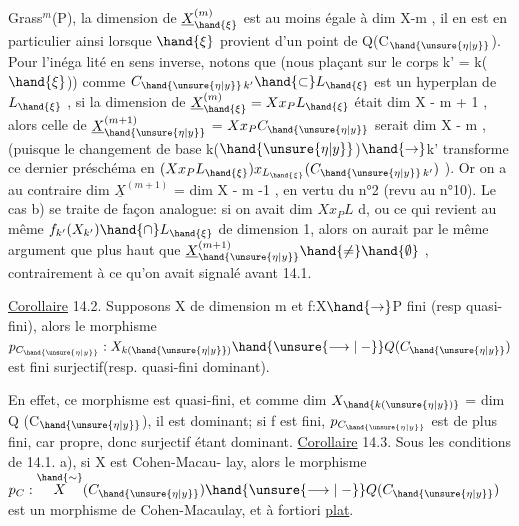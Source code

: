 
Grass$^{m}$(P), la dimension de $\underline{X}^{(m)}_{\hand{\xi}}$ est au moins égale à dim X-m , il en est
en particulier ainsi lorsque $\hand{\xi}$ provient d'un point de Q(C$_{\hand{\unsure{\eta|y}}}$). Pour l'inéga
lité en sens inverse, notons que (nous plaçant sur le corps k' = k($\hand{\xi}$))
comme $C_{\hand{\unsure{\eta|y}}\,k'} \hand{\subset} L_{\hand{\xi}}$ est  un hyperplan de $L_{\hand{\xi}}$ , si la dimension de
$\underline{X}^{(m)}_{\hand{\xi}} = Xx_{P}L_{\hand{\xi}}$ était \hand{$\geqslant$} dim X - m + 1 , alors celle de $\underline{X}^{(m+1)}_{\hand{\unsure{\eta|y}}}$ =
$Xx_{P}C_{\hand{\unsure{\eta|y}}}$ serait \hand{$\geqslant$} dim X - m , (puisque le changement de base k($\hand{\unsure{\eta|y}}$)$\hand{\to}$k'
transforme ce dernier préschéma en $(Xx_{P}L_{\hand{\xi}})x_{L_{\hand{\xi}}}(C_{\hand{\unsure{\eta|y}}\,k'})$ ). Or on a au
contraire  dim $\underline{X}^{(m+1)}$ = dim X - m -1 
, en vertu du n°2 (revu au n°10).
Le cas b)  se traite
de façon analogue: si on avait dim $Xx_{P}L$ \hand{$\geqslant$} d,  ou
ce qui revient au même  $f_{k'}(X_{k'}) \hand{\cap} L_{\hand{\xi}}$ de dimension \hand{$\geqslant$}1,
alors on aurait par le même argument que plus  haut que
$\underline{X}^{(m+1)}_{\hand{\unsure{\eta|y}}} \hand{\neq} \hand{\emptyset}$ , contrairement à ce qu'on avait signalé avant 14.1.

\uline{Corollaire} 14.2. Supposons X de dimension m et f:X$\hand{\to}$P fini (resp quasi-fini), alors
le morphisme $p_{C_{\hand{\unsure{\eta|y}}}} : X_{k(\hand{\unsure{\eta|y}})} \hand{\unsure{\longrightarrow|\relbar}} Q(C_{\hand{\unsure{\eta|y}}})$ est fini surjectif(resp. quasi-fini
dominant).

En effet, ce morphisme est quasi-fini, et comme dim $X_{\hand{k(\unsure{\eta|y})}}$ = dim Q (C$_{\hand{\unsure{\eta|y}}}$), il est
dominant;  si f est fini, $p_{C_{\hand{\unsure{\eta|y}}}}$ est de plus fini,
 car propre, donc surjectif étant dominant.
\uline{Corollaire} 14.3. Sous les conditions de 14.1. a), si X est Cohen-Macau-%
lay, alors le morphisme $p_{C} : \overset{\hand{\sim}}{X}(C_{\hand{\unsure{\eta|y}}}) \hand{\unsure{\longrightarrow|\relbar}} Q(C_{\hand{\unsure{\eta|y}}})$ est un morphisme de
Cohen-Macaulay, et à fortiori \uline{plat}.

